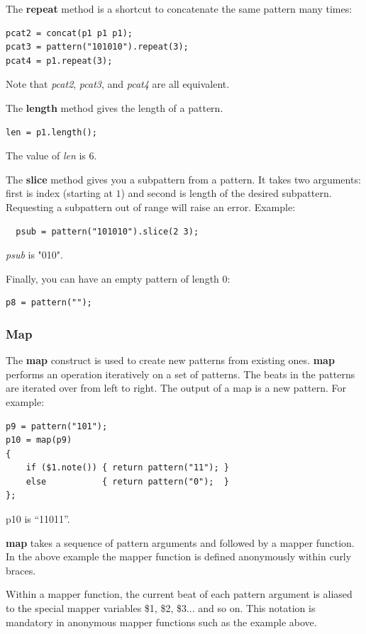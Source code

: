 \documentclass[11pt,twoside]{article}
\begin{document}
The \textbf{repeat} method is a shortcut to concatenate the same pattern many times:
\begin{verbatim}
pcat2 = concat(p1 p1 p1);
pcat3 = pattern("101010").repeat(3);
pcat4 = p1.repeat(3);
\end{verbatim}
Note that \textit{pcat2}, \textit{pcat3}, and \textit{pcat4} are all equivalent.

The \textbf{length} method gives the length of a pattern.
\begin{verbatim}
len = p1.length();
\end{verbatim}
The value of \textit{len} is $6$.

The \textbf{slice} method gives you a subpattern from a pattern.
It takes two arguments: first is index (starting at $1$) and second is
length of the desired subpattern. Requesting a subpattern out of range will
raise an error. Example:
\begin{verbatim}
  psub = pattern("101010").slice(2 3);
\end{verbatim}
\textit{psub} is "010".



Finally, you can have an empty pattern of length $0$:
\begin{verbatim}
p8 = pattern("");
\end{verbatim}



\subsubsection{Map}

The \textbf{map} construct is used to create new patterns from existing ones.
\textbf{map} performs an operation iteratively on a set of patterns.
The beats in the patterns are iterated over from left to right.
The output of a map is a new pattern.  For example:
\begin{verbatim}
p9 = pattern("101");
p10 = map(p9)
{
    if ($1.note()) { return pattern("11"); }
    else           { return pattern("0");  }
};
\end{verbatim}
p10 is ``11011''.

\textbf{map} takes a sequence of pattern arguments and followed by a mapper function.  In the above example the mapper function is defined anonymously within curly braces.

Within a mapper function, the current beat of each pattern argument is aliased to the special mapper variables \$1, \$2, \$3... and so on.  This notation is mandatory in anonymous mapper functions such as the example above.
\end{document}
